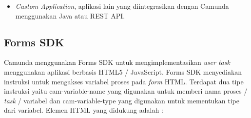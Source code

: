 \begin{itemize}
	\item \textit{Custom Application}, aplikasi lain yang diintegrasikan dengan Camunda menggunakan Java atau REST API.
	
\end{itemize}

\subsection{Forms SDK}
\label{formssdk}
Camunda menggunakan Forms SDK untuk mengimplementasikan \textit{user task} menggunakan aplikasi berbasis HTML5 / JavaScript. Forms SDK menyediakan instruksi untuk mengakses variabel proses pada \textit{form} HTML. Terdapat dua tipe instruksi yaitu cam-variable-name yang digunakan untuk memberi nama proses / \textit{task} / variabel dan cam-variable-type yang digunakan untuk mementukan tipe dari variabel. Elemen HTML yang didukung adalah :
